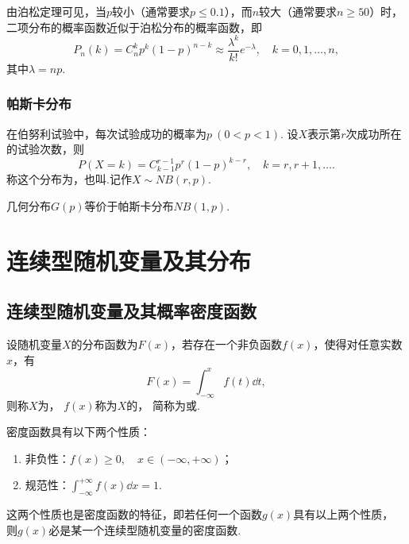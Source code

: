 由泊松定理可见，当\(p\)较小（通常要求\(p \leq 0.1\)），而\(n\)较大（通常要求\(n \geq 50\)）时，
二项分布的概率函数近似于泊松分布的概率函数，即\[
P_n(k) = C_n^k p^k (1-p)^{n-k} \approx \frac{\lambda^k}{k!} e^{-\lambda},
\quad k=0,1,\dotsc,n,
\]其中\(\lambda = n p\).

\subsubsection{帕斯卡分布}
\begin{definition}
在伯努利试验中，每次试验成功的概率为\(p\ (0<p<1)\).
设\(X\)表示第\(r\)次成功所在的试验次数，则\begin{equation}
P(X=k) = C_{k-1}^{r-1} p^r (1-p)^{k-r},
\quad k=r,r+1,\dotsc.
\end{equation}称这个分布为，也叫.记作\(X \sim NB(r, p)\).

几何分布\(G(p)\)等价于帕斯卡分布\(NB(1,p)\).
\end{definition}

\section{连续型随机变量及其分布}
\subsection{连续型随机变量及其概率密度函数}
\begin{definition}
设随机变量\(X\)的分布函数为\(F(x)\)，若存在一个非负函数\(f(x)\)，使得对任意实数\(x\)，有\[
F(x) = \int_{-\infty}^x f(t) \dd{t},
\]则称\(X\)为，
\(f(x)\)称为\(X\)的，
简称为或.
\end{definition}

\begin{property}\label{theorem:随机变量及其分布.连续型随机变量的密度函数的性质}
密度函数具有以下两个性质：
\begin{enumerate}
\item 非负性：\(f(x) \geq 0, \quad x \in (-\infty,+\infty)\)；
\item 规范性：\(\int_{-\infty}^{+\infty} f(x) \dd{x} = 1\).
\end{enumerate}
\rm
这两个性质也是密度函数的特征，即若任何一个函数\(g(x)\)具有以上两个性质，
则\(g(x)\)必是某一个连续型随机变量的密度函数.
\end{property}

